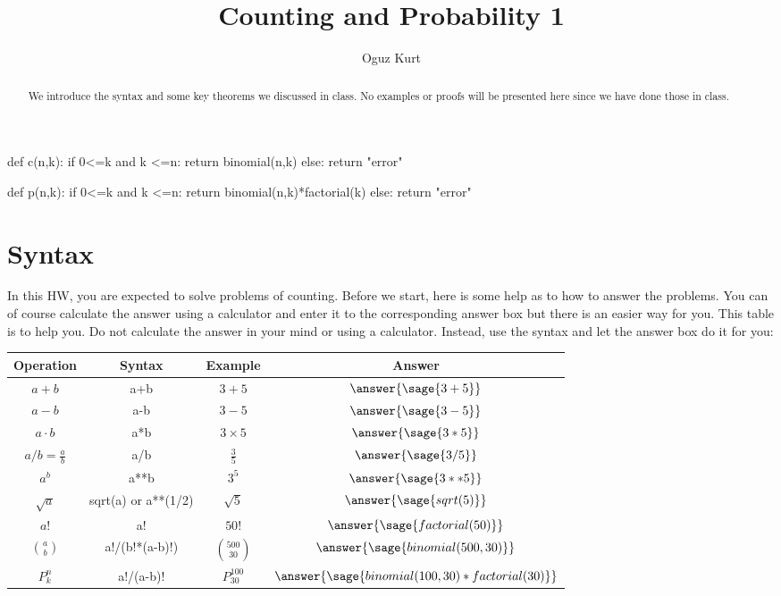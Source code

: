 \documentclass{ximera}
\title{Counting and Probability 1}
\author{Oguz Kurt}
\begin{document}
\begin{abstract}
We introduce the syntax and some key theorems we discussed in class. No examples or proofs will be presented here since we have done those in class.
\end{abstract}
\maketitle


\begin{sagesilent}
def c(n,k):
    if 0<=k and k <=n:
        return binomial(n,k)
    else:
        return "error"

def p(n,k):
    if 0<=k and k <=n:
        return binomial(n,k)*factorial(k)
    else:
        return "error"

\end{sagesilent}

\section*{Syntax}
In this HW, you are expected to solve problems of counting. Before we start, here is some help as to how to answer the problems. You can of course calculate the answer using a calculator and enter it to the corresponding answer box but there is an easier way for you. This table is to help you. Do not calculate the answer in your mind or using a calculator. Instead, use the syntax and let the answer box do it for you:

\hspace{0.5cm}

\begin{tabular}{c|c|c|c}
Operation & Syntax & Example & Answer 
\\
\hline
$a+b$ & {\color{red} a+b} & $3+5$ & $\answer{\sage{3+5} }$
\\
\hline
$a- b$ & {\color{red} a-b} & $3-5$ & $\answer{\sage{3-5} }$
\\
\hline
$a\cdot b$ & {\color{red} a*b} & $3\times 5$ & $\answer{\sage{3*5} }$
\\
\hline
$a/b=\frac{a}{b}$ & {\color{red} a/b} & $\frac{3}{5}$ & $\answer{\sage{3/5} }$
\\
\hline
$a^b$ & {\color{red} a**b} & $3^5$ & $\answer{\sage{3**5} }$
\\
\hline
$\sqrt{a}$ & {\color{red} sqrt(a) or a**(1/2)} & $\sqrt{5}$ & $\answer{\sage{sqrt(5)} }$
\\
\hline
$a!$ & {\color{red} a!} & $50!$ & $\answer{\sage{factorial(50)} }$
\\
\hline
$\binom{a}{b}$ & {\color{red} a!/(b!*(a-b)!)} & $\binom{500}{30}$ & $\answer{\sage{binomial(500,30)} }$ 
\\
\hline
$P_k^n$ & {\color{red} a!/(a-b)!} & $P_{30}^{100}$ & $\answer{\sage{binomial(100,30)*factorial(30)} }$ 
\\
\end{tabular}
\end{document}
